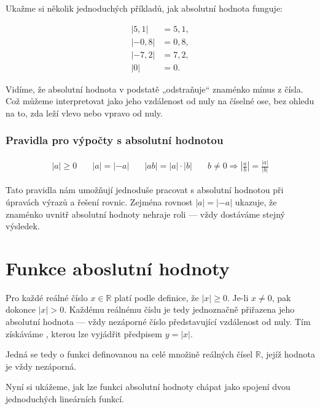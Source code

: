 \documentclass[12pt,a4paper]{article}
\begin{document}
\begin{examplebox}
Ukažme si několik jednoduchých příkladů, jak absolutní hodnota funguje:

\[
\begin{aligned}
|5{,}1| &= 5{,}1, \\
|-0{,}8| &= 0{,}8, \\
|-7{,}2| &= 7{,}2, \\
|0| &= 0.
\end{aligned}
\]

Vidíme, že absolutní hodnota v podstatě „odstraňuje“ znaménko mínus z čísla. 
Což můžeme interpretovat jako jeho vzdálenost od nuly na číselné ose,
 bez ohledu na to, zda leží vlevo nebo vpravo od nuly.
\end{examplebox}

\subsubsection*{Pravidla pro výpočty s absolutní hodnotou}

\[
\begin{array}{cccc}
|a| \ge 0 
& \quad |a| = |-a| 
& \quad |ab| = |a| \cdot |b| 
& \quad b \ne 0 \Rightarrow \left|\frac{a}{b}\right| = \frac{|a|}{|b|}
\end{array}
\]

\smallskip

Tato pravidla nám umožňují jednoduše pracovat s absolutní hodnotou při úpravách výrazů a řešení rovnic.  
Zejména rovnost $|a| = |-a|$ ukazuje, že znaménko uvnitř absolutní hodnoty nehraje roli — vždy dostáváme stejný výsledek.

\newpage
\section{Funkce aboslutní hodnoty}
Pro každé reálné číslo $x \in \mathbb{R}$ platí podle definice, že $|x| \ge 0$.  
Je-li $x \ne 0$, pak dokonce $|x| > 0$.  
Každému reálnému číslu je tedy jednoznačně přiřazena jeho absolutní hodnota — vždy nezáporné číslo představující vzdálenost od nuly.  
Tím získáváme , kterou lze vyjádřit předpisem
$
y = |x|.
$

Jedná se tedy o funkci definovanou na celé množině reálných čísel $\mathbb{R}$, jejíž hodnota je vždy nezáporná.


Nyní si ukážeme, jak lze funkci absolutní hodnoty chápat jako spojení dvou jednoduchých lineárních funkcí.
\end{document}
